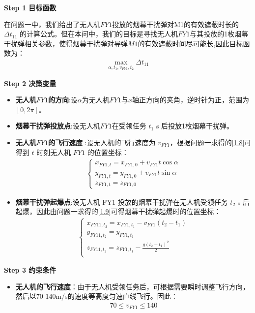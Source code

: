 \documentclass[../main.tex]{subfiles}
\begin{document}
\noindent \textbf{Step 1 目标函数}
\par 在问题一中，我们给出了无人机$FY1$投放的烟幕干扰弹对M1的有效遮蔽时长的$\Delta t_{11}$ 的计算公式。但在本问中，我们的目标是寻找无人机$FY1$与其投放的1枚烟幕干扰弹相关参数，使得烟幕干扰弹对导弹$M1$的有效遮蔽时间尽可能长,因此目标函数为：
\begin{align}\label{10.1}
  \underset{\alpha ,t_1,v_{FY1},t_2}{\max}\Delta t_{11}
\end{align}



\noindent \textbf{Step 2 决策变量}

\begin{itemize}
\item \textbf{无人机$FY1$的方向}:设$\alpha $为无人机$FY1$与$x$轴正方向的夹角，逆时针为正，范围为$\left[ 0,2\pi \right] $。
\item \textbf{烟幕干扰弹投放点}:设无人机$FY1$在受领任务 \( t_1 \) s 后投放1枚烟幕干扰弹。
\item  \textbf{无人机$FY1$的飞行速度} :设无人机的飞行速度为 \( v_{FY1} \)，根据问题一求得的\eqref{1.8}可得到 \( t \) 时刻无人机 \( FY1 \) 的位置坐标：
\begin{align}\label{10.3}
\begin{cases}
x_{FY1,t} = x_{FY1,0} + v_{FY1} t \cos\alpha \\
y_{FY1,t} = y_{FY1,0} + v_{FY1} t \sin\alpha \\
z_{FY1,t} = z_{FY1,0}
\end{cases}
\end{align}
\item \textbf{烟幕干扰弹起爆点}:设无人机 FY1 投放的烟幕干扰弹在无人机受领任务 \( t_2 \) s 后起爆，因此由问题一求得的\eqref{1.9}可得烟幕干扰弹起爆时的位置坐标：
\begin{align}\label{10.4}
    \left\{ \begin{array}{l}
	x_{FY11,t_2}=x_{FY1,t_1}-v_{FY1}\left( t_2-t_1 \right)\\
	y_{FY11,t_2}=y_{FY1,t_1}\\
	z_{FY11,t_2}=z_{FY1,t_1}-\frac{g\left( t_2-t_1 \right) ^2}{2}\\
\end{array} \right. 
\end{align}
\end{itemize}

\noindent \textbf{Step 3 约束条件}
\begin{itemize}
\item \textbf{无人机的飞行速度}：由于无人机受领任务后，可根据需要瞬时调整飞行方向，然后以70-140m/s的速度等高度匀速直线飞行。因此：
\begin{align}\label{10.8}
  70 \leq v_{FY1} \leq 140
\end{align}
\end{itemize}
\end{document}
